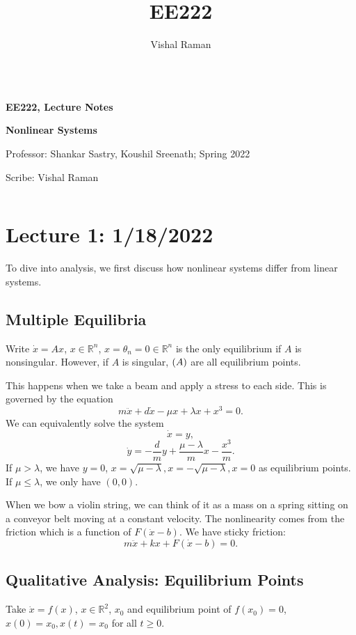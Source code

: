 \documentclass[11pt]{scrartcl}
\newcommand{\R}{\mathbb{R}}
\newcommand{\1}{\textbf{1}} %
\begin{document}
\title{EE222}
\author{Vishal Raman}
\thispagestyle{empty}
$ $
\vfill
\begin{center}

\centerline{\huge \textbf{EE222, Lecture Notes}}
\centerline{\Large \textbf{Nonlinear Systems} }
\centerline{Professor: Shankar Sastry, Koushil Sreenath; Spring 2022}
\centerline{Scribe: Vishal Raman}
\end{center}
\vfill
$ $
\newpage
\thispagestyle{empty}
\tableofcontents
\newpage

\section{Lecture 1: 1/18/2022}
To dive into analysis, we first discuss how nonlinear systems differ from linear systems.
\subsection{Multiple Equilibria}
Write $\dot x = Ax$, $x \in \R^n$, $x = \theta_n = 0 \in \R^n$ is the only equilibrium if $A$ is nonsingular.  However, if $A$ is singular, $\null(A)$ are all equilibrium points.  

\begin{example} This happens when we take a beam and apply a stress to each side. This is governed by the equation
$$m\ddot{x} + d\dot x - \mu x + \lambda x + x^3 = 0.$$
We can equivalently solve the system
$$\dot x = y,$$
$$\dot y = -\frac{d}{m}y + \frac{\mu - \lambda}{m}x - \frac{x^3}{m}.$$
If $\mu > \lambda$, we have $y = 0$, $x = \sqrt{\mu - \lambda}, x = -\sqrt{\mu - \lambda}, x = 0$ as equilibrium points. If $\mu \le \lambda$, we only have $(0, 0)$.
\end{example}

\begin{example} When we bow a violin string, we can think of it as a mass on a spring sitting on a conveyor belt moving at a constant velocity.  The nonlinearity comes from the friction which is a function of $F(\dot{x} - b)$.  We have sticky friction:
$$m\ddot{x} + kx + F(\dot{x} - b) = 0.$$
\end{example}

\subsection{Qualitative Analysis: Equilibrium Points}
Take $\dot{x} = f(x)$, $x \in \R^2$, $x_0$ and equilibrium point of $f(x_0) = 0$, $x(0) = x_0, x(t) = x_0$ for all $t \ge 0$.
\end{document}
